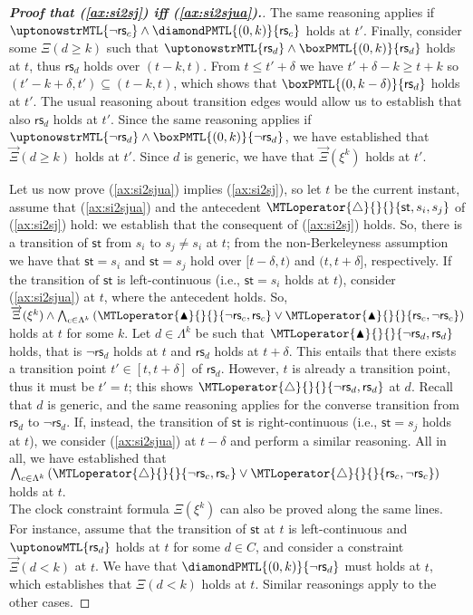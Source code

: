 \documentclass[a4paper]{article}
\newcommand{\frf}[1]{(\ref{#1})}
\newcommand{\st}{\mathsf{st}}
\newcommand{\rest}[1]{\mathsf{rs}_{#1}}
\newcommand{\becomesMTL}[1]{\MTLoperator{\triangle}{}{}{#1}}
\newcommand{\becomesOMTL}[1]{\MTLoperator{\blacktriangle}{}{}{#1}}
\newcommand{\becomesLMTL}[1]{\becomesOMTL{#1}}
\newcommand{\XiL}{\overrightarrow{\Xi}}
\theoremstyle{plain}
\theoremstyle{definition}
\begin{document}
\begin{proof}[\textbf{Proof that \frf{ax:si2sj} iff \frf{ax:si2sjua}.}]
The same reasoning applies if $\uptonowstrMTL{\neg \rest{c}} \wedge \diamondPMTL{(0, k)}{\rest{c}}$ holds at $t'$.
Finally, consider some $\Xi\left(d \geq k\right)$ such that $\uptonowstrMTL{\rest{d}} \wedge \boxPMTL{(0, k)}{\rest{d}}$ holds at $t$, thus $\rest{d}$ holds over $(t-k, t)$.
From $t \leq t'+\delta$ we have $t'+\delta-k \geq t+k$ so $(t'-k+\delta, t') \subseteq (t-k, t)$, which shows that $\boxPMTL{(0, k-\delta)}{\rest{d}}$ holds at $t'$.
The usual reasoning about transition edges would allow us to establish that also $\rest{d}$ holds at $t'$.
Since the same reasoning applies if $\uptonowstrMTL{\neg \rest{d}} \wedge \boxPMTL{(0, k)}{\neg \rest{d}}$, we have established that $\XiL(d \geq k)$ holds at $t'$.
Since $d$ is generic, we have that $\XiL(\xi^k)$ holds at $t'$.

Let us now prove \frf{ax:si2sjua} implies \frf{ax:si2sj}, so let $t$ be the current instant, assume that \frf{ax:si2sjua} and the antecedent $\becomesMTL{\st, s_i, s_j}$ of \frf{ax:si2sj} hold: we establish that the consequent of \frf{ax:si2sj} holds.
So, there is a transition of $\st$ from $s_i$ to $s_j \neq s_i$ at $t$; from the non-Berkeleyness assumption we have that $\st = s_i$ and $\st = s_j$ hold over $[t-\delta, t)$ and $(t, t+\delta]$, respectively.
If the transition of $\st$ is left-continuous (i.e., $\st = s_i$ holds at $t$), consider \frf{ax:si2sjua} at $t$, where the antecedent holds.
So, $\XiL(\xi^k) \wedge \bigwedge_{c \in \Lambda^k} \left( \becomesLMTL{\neg \rest{c}, \rest{c}} \vee \becomesLMTL{\rest{c}, \neg \rest{c}} \right)$ holds at $t$ for some $k$.
Let $d \in \Lambda^k$ be such that $\becomesLMTL{\neg \rest{d}, \rest{d}}$ holds, that is $\neg \rest{d}$ holds at $t$ and $\rest{d}$ holds at $t+\delta$.
This entails that there exists a transition point $t' \in [t, t+\delta]$ of $\rest{d}$.
However, $t$ is already a transition point, thus it must be $t' = t$; this shows $\becomesMTL{\neg \rest{d}, \rest{d}}$ at $d$.
Recall that $d$ is generic, and the same reasoning applies for the converse transition from $\rest{d}$ to $\neg \rest{d}$.
If, instead, the transition of $\st$ is right-continuous (i.e., $\st = s_j$ holds at $t$), we consider \frf{ax:si2sjua} at $t-\delta$ and perform a similar reasoning.
All in all, we have established that $\bigwedge_{c \in \Lambda^k} \left( \becomesMTL{\neg \rest{c}, \rest{c}} \vee \becomesMTL{\rest{c}, \neg \rest{c}} \right)$ holds at $t$.\\
The clock constraint formula $\Xi(\xi^k)$ can also be proved along the same lines.
For instance, assume that the transition of $\st$ at $t$ is left-continuous and $\uptonowMTL{\rest{d}}$ holds at $t$ for some $d \in C$, and consider a constraint $\XiL(d < k)$ at $t$.
We have that $\diamondPMTL{(0,k)}{\neg \rest{d}}$ must holds at $t$, which establishes that $\Xi(d < k)$ holds at $t$.
Similar reasonings apply to the other cases.
\end{proof}
\end{document}
